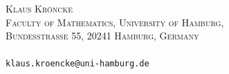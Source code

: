 \documentclass[a4paper,10pt]{article}
\theoremstyle{plain}
\theoremstyle{definition}
\theoremstyle{remark}
\theoremstyle{plain}
\numberwithin{equation}{section}
\begin{document}
\noindent
\textsc{Klaus Kr\"oncke\\
Faculty of Mathematics, University of Hamburg,\\
Bundesstrasse 55, 20241 Hamburg, Germany}\\ 
\vspace{-0.4cm}\\
\texttt{klaus.kroencke@uni-hamburg.de}\\
\end{document}
